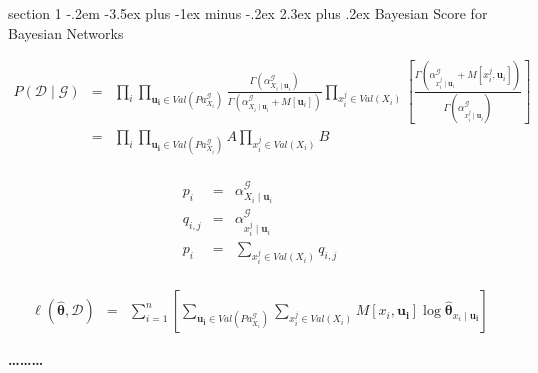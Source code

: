 \documentclass[12pt]{article}
\makeatletter
\newenvironment{problem}{\@startsection
       {section}
       {1}
       {-.2em}
       {-3.5ex plus -1ex minus -.2ex}
       {2.3ex plus .2ex}
       {\pagebreak[3]%
       \large\bf\noindent{Problem }
       }
       }
       {%
       \begin{center}\large\bf \ldots\ldots\ldots\end{center}}
\makeatother
\begin{document}
\begin{problem}{Bayesian Score for Bayesian Networks}

\begin{eqnarray*}
P( \mathcal{D} \mid \mathcal{G}) & = & 
\prod_i \prod _{\mathbf{u_{i}} \in Val(Pa^{\mathcal{G}}_{X_{i}})} 
\frac{\Gamma(\alpha^{\mathcal{G}}_{X_{i}\mid \mathbf{u}_{i}})}{\Gamma(\alpha^{\mathcal{G}}_{X_{i}\mid \mathbf{u}_{i}} + M[ \mathbf{u}_{i}])} 
\prod_{x_{i}^{j} \in Val(X_{i})} 
\left[ \frac{\Gamma(\alpha^{\mathcal{G}}_{x_{i}^{j}\mid \mathbf{u}_{i}} + M[ x_{i}^{j},\mathbf{u}_{i}])}{\Gamma(\alpha^{\mathcal{G}}_{x_{i}^{j}\mid \mathbf{u}_{i}} )} \right]\\
& = & 
\prod_i \prod _{\mathbf{u_{i}} \in Val(Pa^{\mathcal{G}}_{X_{i}})} 
A
\prod_{x_{i}^{j} \in Val(X_{i})} 
B\\
\end{eqnarray*}

\begin{eqnarray*}
p_{i} & = & \alpha^{\mathcal{G}}_{X_{i}\mid \mathbf{u}_{i}}\\
q_{i,j} & = & \alpha^{\mathcal{G}}_{x_{i}^{j}\mid \mathbf{u}_{i}}   \\
p_{i} & = & \sum_{x_{i}^{j} \in Val(X_{i})} q_{i,j}\\
\end{eqnarray*}


\begin{eqnarray*}
\ell(\hat{\mathbf{\theta}},\mathcal{D}) & = & 
	\sum^{n}_{i=1} \left[ 
	\sum_{\mathbf{u_{i}} \in Val(Pa^{\mathcal{G}}_{X_{i}})}  
	\sum_{x_{i}^{j} \in Val(X_{i})}  
	M[x_{i},\mathbf{u_{i}}] \log \hat{\mathbf{\theta}}_{x_{i} \mid \mathbf{u_{i}}} \right]
\end{eqnarray*}



\end{problem}
\end{document}

